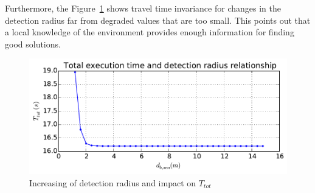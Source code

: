 Furthermore, the Figure~\ref{fig:drhotot} shows travel time
invariance for changes in the detection radius far from degraded values that are too small.
This points out that a local knowledge of the environment provides enough information for finding good solutions.
\begin{figure}[!h]\centering
  \includegraphics[width=\linewidth]{./images/drho/drho-tot.pdf}
  \caption{Increasing of detection radius and impact on
  $T_{tot}$\label{fig:drhotot}}
\end{figure}

%
%
%



